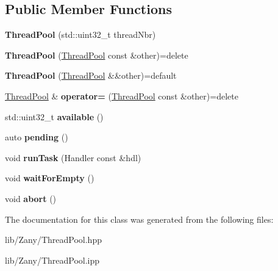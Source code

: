 \subsection*{Public Member Functions}
\begin{DoxyCompactItemize}
\item 
\mbox{\label{classzany_1_1_thread_pool_af331f281f2de4b03b6adf53b6570f785}} 
{\bfseries Thread\+Pool} (std\+::uint32\+\_\+t thread\+Nbr)
\item 
\mbox{\label{classzany_1_1_thread_pool_a25f5a43464eebcc3caf9078cb328303d}} 
{\bfseries Thread\+Pool} (\hyperlink{classzany_1_1_thread_pool}{Thread\+Pool} const \&other)=delete
\item 
\mbox{\label{classzany_1_1_thread_pool_aa32102cf4a07efe4cc2ec813f8630498}} 
{\bfseries Thread\+Pool} (\hyperlink{classzany_1_1_thread_pool}{Thread\+Pool} \&\&other)=default
\item 
\mbox{\label{classzany_1_1_thread_pool_a6203a91f947417bc1eafc406ee907c99}} 
\hyperlink{classzany_1_1_thread_pool}{Thread\+Pool} \& {\bfseries operator=} (\hyperlink{classzany_1_1_thread_pool}{Thread\+Pool} const \&other)=delete
\item 
\mbox{\label{classzany_1_1_thread_pool_aa20407f0fee89ccac5dc49731b3c76df}} 
std\+::uint32\+\_\+t {\bfseries available} ()
\item 
\mbox{\label{classzany_1_1_thread_pool_a9960f7dcc7d98209c473da47229047c2}} 
auto {\bfseries pending} ()
\item 
\mbox{\label{classzany_1_1_thread_pool_a1b1a1ad0740c403ce673d458f0bb120a}} 
void {\bfseries run\+Task} (Handler const \&hdl)
\item 
\mbox{\label{classzany_1_1_thread_pool_a1bb322954083f50905b5282d6726a135}} 
void {\bfseries wait\+For\+Empty} ()
\item 
\mbox{\label{classzany_1_1_thread_pool_ae6bf0f7f7af399319389cdc1cbf52e6d}} 
void {\bfseries abort} ()
\end{DoxyCompactItemize}


The documentation for this class was generated from the following files\+:\begin{DoxyCompactItemize}
\item 
lib/\+Zany/Thread\+Pool.\+hpp\item 
lib/\+Zany/Thread\+Pool.\+ipp\end{DoxyCompactItemize}
